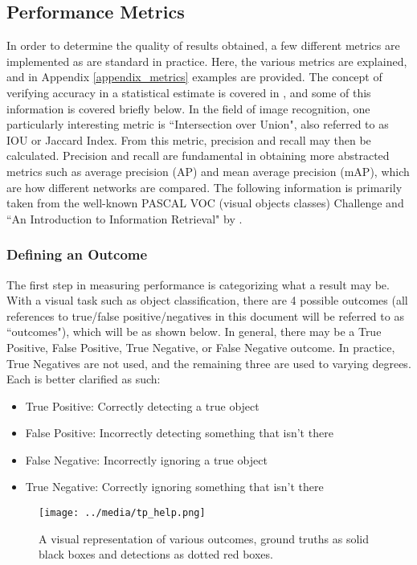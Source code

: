 \subsection{Performance Metrics}
In order to determine the quality of results obtained, a few different metrics are implemented as are standard in practice. Here, the various metrics are explained, and in Appendix \ref{appendix_metrics} examples are provided. The concept of verifying accuracy in a statistical estimate is covered in \cite{manning_introduction_2008}, and some of this information is covered briefly below. In the field of image recognition, one particularly interesting metric is ``Intersection over Union", also referred to as IOU or Jaccard Index. From this metric, precision and recall may then be calculated. Precision and recall are fundamental in obtaining more abstracted metrics such as average precision (AP) and mean average precision (mAP), which are how different networks are compared. The following information is primarily taken from the well-known PASCAL VOC (visual objects classes) Challenge \cite{everingham_pascal_2010} and ``An Introduction to Information Retrieval" by \cite{manning_introduction_2008}.

\subsubsection{Defining an Outcome}
The first step in measuring performance is categorizing what a result may be. With a visual task such as object classification, there are 4 possible outcomes (all references to true/false positive/negatives in this document will be referred to as ``outcomes"), which will be  as shown below. In general, there may be a True Positive, False Positive, True Negative, or False Negative outcome. In practice, True Negatives are not used, and the remaining three are used to varying degrees. Each is better clarified as such:
\begin{itemize} \itemsep=-.5em
	\item True Positive: Correctly detecting a true object
	\item False Positive: Incorrectly detecting something that isn't there
	\item False Negative: Incorrectly ignoring a true object
	\item True Negative: Correctly ignoring something that isn't there
\end{itemize}

\begin{figure}[H]
	\centering
	\texttt{[image: ../media/tp\_help.png]}
	\caption{A visual representation of various outcomes, ground truths as solid black boxes and detections as dotted red boxes.}
	\label{tp_help}
\end{figure}

